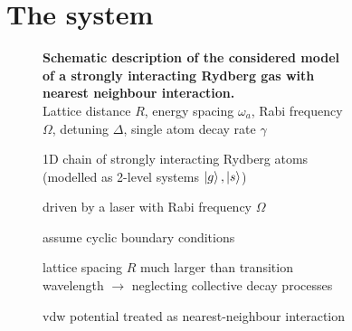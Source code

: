 \documentclass[a0,plainsections]{sciposter}
\begin{document}
\begin{multicols}{2}
\begin{figure}
		\section{The system}
		\begin{figure}
			\centering
			\captionsetup{type=figure}
			\vspace*{-40pt} %
			
			\caption{\textbf{Schematic description of the considered model of a strongly interacting Rydberg gas with nearest neighbour interaction.}\\ Lattice distance $R$, energy spacing $\omega_a$, Rabi frequency $\Omega$, detuning $\Delta$, single atom decay rate $\gamma$}
		\end{figure}

		\begin{figure}
			\begin{AutoMultiColItemize}
				\item 1D chain of strongly interacting Rydberg atoms \\(modelled as 2-level systems $\ket{g},\ket{s}$)
				\item driven by a laser with Rabi frequency $\Omega$
				\item assume cyclic boundary conditions
				\item lattice spacing $R$ much larger than transition wavelength $\rightarrow$ neglecting collective decay processes \cite{nott61187}
				\item \ac{vdw} potential treated as nearest-neighbour interaction \cite{Olmos2009,Ates2012}
			\end{AutoMultiColItemize}
		\end{figure}
	\end{figure}

	\begin{figure}

\end{figure}
\end{multicols}
\end{document}
